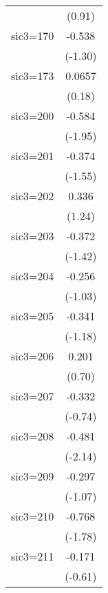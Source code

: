 \begin{table}[htbp]
\begin{tabular*}{0.8\hsize}{@{\hskip\tabcolsep\extracolsep\fill}l*{1}{c}}
                    &      (0.91)         \\
\addlinespace
sic3=170            &      -0.538         \\
                    &     (-1.30)         \\
\addlinespace
sic3=173            &      0.0657         \\
                    &      (0.18)         \\
\addlinespace
sic3=200            &      -0.584         \\
                    &     (-1.95)         \\
\addlinespace
sic3=201            &      -0.374         \\
                    &     (-1.55)         \\
\addlinespace
sic3=202            &       0.336         \\
                    &      (1.24)         \\
\addlinespace
sic3=203            &      -0.372         \\
                    &     (-1.42)         \\
\addlinespace
sic3=204            &      -0.256         \\
                    &     (-1.03)         \\
\addlinespace
sic3=205            &      -0.341         \\
                    &     (-1.18)         \\
\addlinespace
sic3=206            &       0.201         \\
                    &      (0.70)         \\
\addlinespace
sic3=207            &      -0.332         \\
                    &     (-0.74)         \\
\addlinespace
sic3=208            &      -0.481\sym{*}  \\
                    &     (-2.14)         \\
\addlinespace
sic3=209            &      -0.297         \\
                    &     (-1.07)         \\
\addlinespace
sic3=210            &      -0.768         \\
                    &     (-1.78)         \\
\addlinespace
sic3=211            &      -0.171         \\
                    &     (-0.61)         \\

\end{tabular*}
\end{table}
